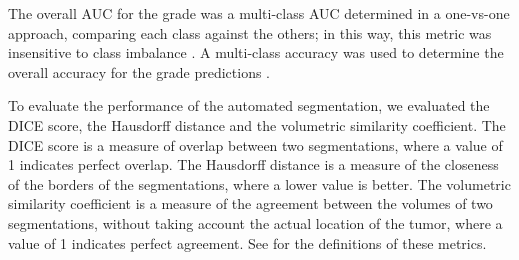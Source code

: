 \begin{subappendices}
The overall \gls{AUC} for the grade was a multi-class \gls{AUC} determined in a one-vs-one approach, comparing each class against the others; in this way, this metric was insensitive to class imbalance \autocite{hand2001AUC}.
A multi-class accuracy was used to determine the overall accuracy for the grade predictions \autocite{tharwat2018metrics}.


To evaluate the performance of the automated segmentation, we  evaluated the DICE score, the Hausdorff distance and the volumetric similarity coefficient.
The DICE score is a measure of overlap between two segmentations, where a value of 1 indicates perfect overlap.
The Hausdorff distance is a measure of the closeness of the borders of the segmentations, where a lower value is better.
The volumetric similarity coefficient is a measure of the agreement between the volumes of two segmentations, without taking account the actual location of the \gls{tumor}, where a value of 1 indicates perfect agreement.
See  for the definitions of these metrics.

\newpage


\end{subappendices}
